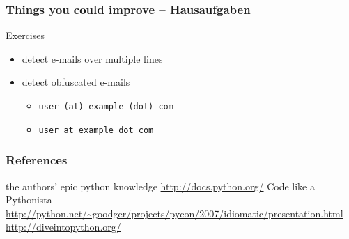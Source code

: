 \documentclass{beamer}
\begin{document}
\begin{frame}[fragile]
	\frametitle{Things you could improve -- Hausaufgaben}
	
	\begin{block}{Exercises}
	\begin{itemize}
	\item[\checkmark] detect e-mails over multiple lines
	\item[\checkmark] detect obfuscated e-mails
		\begin{itemize}
		\item[\checkmark] \texttt{user (at) example (dot) com}
		\item[\checkmark] \texttt{user at example dot com}
		\end{itemize}
	\end{itemize}
	\end{block}
\end{frame}

\begin{frame}
	\frametitle{References}
	\begin{thebibliography}{3}
	 the authors' epic python knowledge
	 \url{http://docs.python.org/}
	 Code like a Pythonista -- \url{http://python.net/~goodger/projects/pycon/2007/idiomatic/presentation.html}
	 \url{http://diveintopython.org/}
	\end{thebibliography}
\end{frame}
\end{document}
